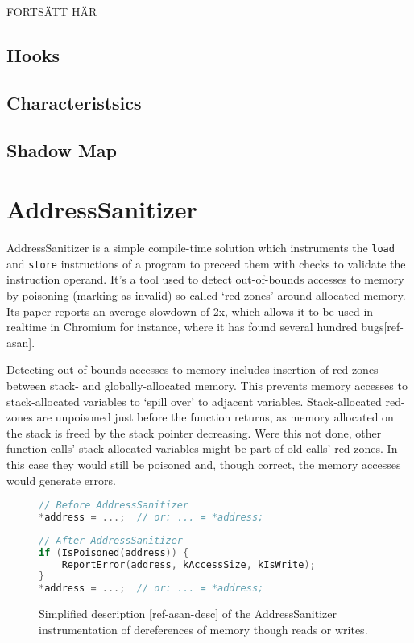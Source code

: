 FORTSÄTT HÄR

\subsection {Hooks}

\subsection {Characteristsics}

\subsection {Shadow Map}


\section {AddressSanitizer}

AddressSanitizer is a simple compile-time solution which instruments the
\texttt{load} and \texttt{store} instructions of a program to preceed them with
checks to validate the instruction operand.
It's a tool used to detect out-of-bounds accesses to memory by poisoning
(marking as invalid) so-called `red-zones' around allocated memory.
Its paper reports an average slowdown of 2x, which allows it to be used in
realtime in Chromium for instance, where it has found several hundred
bugs[ref-asan].

Detecting out-of-bounds accesses to memory includes insertion of red-zones
between stack- and globally-allocated memory.
This prevents memory accesses to stack-allocated variables to `spill over' to
adjacent variables.
Stack-allocated red-zones are unpoisoned just before the function returns, as
memory allocated on the stack is freed by the stack pointer decreasing.
Were this not done, other function calls' stack-allocated variables might be
part of old calls' red-zones.
In this case they would still be poisoned and, though correct, the memory
accesses would generate errors.

\begin{figure}[ht]
\begin{lstlisting}[language=C]
// Before AddressSanitizer
*address = ...;  // or: ... = *address;
\end{lstlisting}

\begin{lstlisting}[language=C]
// After AddressSanitizer
if (IsPoisoned(address)) {
    ReportError(address, kAccessSize, kIsWrite);
}
*address = ...;  // or: ... = *address;
\end{lstlisting}
\caption{Simplified description [ref-asan-desc] of the AddressSanitizer
instrumentation of dereferences of memory though reads or writes.}
\end{figure}

